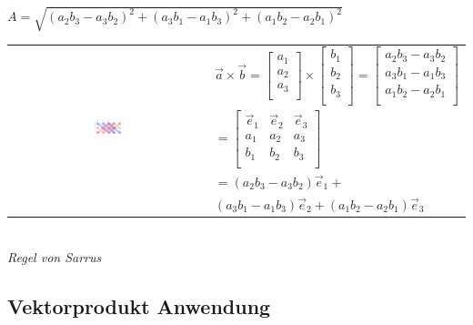 $A = \sqrt{(a_2 b_3 - a_3 b_2)^2 + (a_3 b_1 - a_1 b_3)^2 + (a_1 b_2 - a_2 b_1)^2}$ \\

\begin{tabular}{cl}
    \multirow{5}{*}{
        \includegraphics[width=0.15\textwidth]{assets/vectorproduct-build.png}
    }
    & $\vec{a} \times \vec{b} = \begin{bmatrix}
    		a_1 \\
    		a_2 \\
    		a_3 \\
    	\end{bmatrix} \times \begin{bmatrix}
    		b_1 \\
    		b_2 \\
    		b_3 \\
    	\end{bmatrix} = \begin{bmatrix}
    		a_2 b_3 - a_3 b_2 \\
    		a_3 b_1 - a_1 b_3 \\
    		a_1 b_2 - a_2 b_1 \\
    	\end{bmatrix}$ \\
    	& $= \begin{bmatrix}
            \vec{e}_1 & \vec{e}_2 & \vec{e}_3 \\
            a_1 & a_2 & a_3 \\
            b_1 & b_2 & b_3 \\
        \end{bmatrix}$ \\
    & $= (a_2 b_3 - a_3 b_2) \vec{e}_1 +$ \\
    & $(a_3 b_1 - a_1 b_3) \vec{e}_2 + (a_1 b_2 - a_2 b_1) \vec{e}_3 $ \\
\end{tabular} \\
\textit{Regel von Sarrus} \\

\subsection{Vektorprodukt Anwendung}

